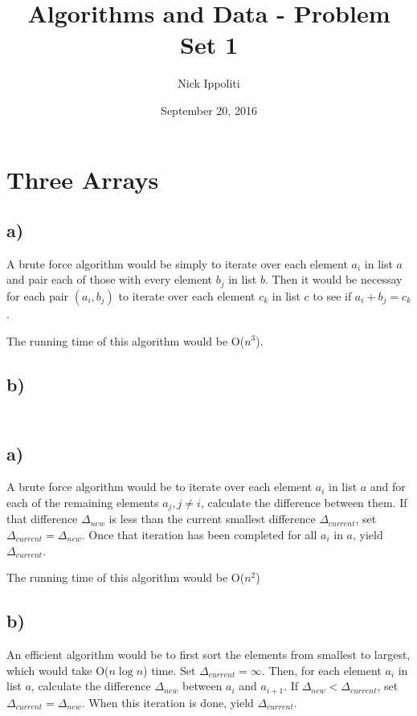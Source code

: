 \documentclass[14pt, letterpaper]{article}
\title{Algorithms and Data - Problem Set 1}
\author{Nick Ippoliti}
\date{September 20, 2016}
\begin{document}
\begin{titlepage}
\maketitle
\end{titlepage}

\section{Three Arrays}
\subsection{a)}
A brute force algorithm would be simply to iterate over each element $a_i$ in 
list $a$ and pair each of those with every element $b_j$ in list $b$. Then it
would be necessay for each pair $(a_i, b_j)$ to iterate over each element $c_k$
in list $c$ to see if $a_i + b_j = c_k$.

The running time of this algorithm would be O($n^3$).

\subsection{b)}
\begin{lstlisting}

\end{lstlisting}

\section{}
\subsection{a)}
A brute force algorithm would be to iterate over each element $a_i$ in list $a$
and for each of the remaining elements $a_j, j \neq i$, calculate the difference
between them. If that difference $\Delta_{new}$ is less than the current 
smallest difference $\Delta_{current}$, set $\Delta_{current} =  \Delta_{new}$.
Once that iteration has been completed for all $a_i$ in $a$, yield 
$\Delta_{current}$.

The running time of this algorithm would be O($n^2$)

\subsection{b)}
An efficient algorithm would be to first sort the elements from smallest to
largest, which would take O($n \log n$) time. Set $\Delta_{current} = \infty$.
Then, for each element $a_i$ in list $a$, calculate the difference
$\Delta_{new}$ between $a_i$ and $a_{i + 1}$. If
$\Delta_{new} < \Delta_{current}$, set $\Delta_{current} = \Delta_{new}$.
When this iteration is done, yield $\Delta_{current}$.
\end{document}
